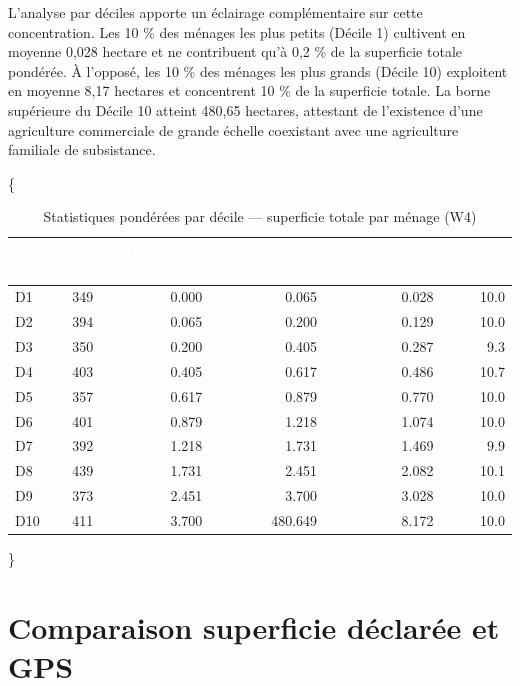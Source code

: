 \documentclass[
  french,
  10pt,
]{article}
\begin{document}
L'analyse par déciles apporte un éclairage complémentaire sur cette
concentration. Les 10 \% des ménages les plus petits (Décile 1)
cultivent en moyenne 0,028 hectare et ne contribuent qu'à 0,2 \% de la
superficie totale pondérée. À l'opposé, les 10 \% des ménages les plus
grands (Décile 10) exploitent en moyenne 8,17 hectares et concentrent 10
\% de la superficie totale. La borne supérieure du Décile 10 atteint
480,65 hectares, attestant de l'existence d'une agriculture commerciale
de grande échelle coexistant avec une agriculture familiale de
subsistance.

\{ \small {}

\begin{table}

\caption{\label{tab:deciles}Statistiques pondérées par décile --- superficie totale par ménage (W4)}
\centering
\begin{tabular}[t]{lrrrrr}
\toprule
\cellcolor{NavyBlue}\textcolor{white}{\textbf{Décile}} & \cellcolor{NavyBlue}\textcolor{white}{\textbf{N}} & \cellcolor{NavyBlue}\textcolor{white}{\textbf{Borne inf. (ha)}} & \cellcolor{NavyBlue}\textcolor{white}{\textbf{Borne sup. (ha)}} & \cellcolor{NavyBlue}\textcolor{white}{\textbf{Moy. pond. (ha)}} & \cellcolor{NavyBlue}\textcolor{white}{\textbf{Part (\%)}}\\
\midrule
D1 & 349 & 0.000 & 0.065 & 0.028 & 10.0\\
D2 & 394 & 0.065 & 0.200 & 0.129 & 10.0\\
D3 & 350 & 0.200 & 0.405 & 0.287 & 9.3\\
D4 & 403 & 0.405 & 0.617 & 0.486 & 10.7\\
D5 & 357 & 0.617 & 0.879 & 0.770 & 10.0\\
D6 & 401 & 0.879 & 1.218 & 1.074 & 10.0\\
D7 & 392 & 1.218 & 1.731 & 1.469 & 9.9\\
D8 & 439 & 1.731 & 2.451 & 2.082 & 10.1\\
D9 & 373 & 2.451 & 3.700 & 3.028 & 10.0\\
D10 & 411 & 3.700 & 480.649 & 8.172 & 10.0\\
\bottomrule
\end{tabular}
\end{table}

\}

\section{Comparaison superficie déclarée et GPS}\label{gps}
\end{document}
